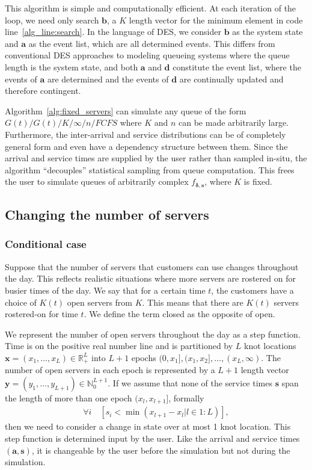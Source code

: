 \documentclass[article]{jss}
\begin{document}
This algorithm is simple and computationally efficient. At each iteration of the loop, we need only search $\mathbf{b}$, a $K$ length vector for the minimum element in code line~\ref{alg_line:search}. In the language of DES, we consider $\mathbf{b}$ as the system state and $\mathbf{a}$ as the event list, which are all determined events. This differs from conventional DES approaches to modeling queueing systems where the queue length is the system state, and both $\mathbf{a}$ and $\mathbf{d}$ constitute the event list, where the events of $\mathbf{a}$ are determined and the events of $\mathbf{d}$ are continually updated and therefore contingent.  

Algorithm~\ref{alg:fixed_servers} can simulate any queue of the form $G(t)/G(t)/K/\infty/n/\mathit{FCFS}$ where $K$ and $n$ can be made arbitrarily large. Furthermore, the inter-arrival and service distributions can be of completely general form and even have a dependency structure between them. Since the arrival and service times are supplied by the user rather than sampled in-situ, the algorithm ``decouples'' statistical sampling from queue computation. This frees the user to simulate queues of arbitrarily complex $f_{\boldsymbol{\delta}, \mathbf{s}}$, where $K$ is fixed. 

\subsection{Changing the number of servers}

\subsubsection{Conditional case}

Suppose that the number of servers that customers can use changes throughout the day. This reflects realistic situations where more servers are rostered on for busier times of the day. We say that for a certain time $t$, the customers have a choice of $K(t)$ open servers from $K$. This means that there are $K(t)$ servers rostered-on for time $t$. We define the term closed as the opposite of open. 

We represent the number of open servers throughout the day as a step
function. Time is on the positive real number line and is partitioned
by $L$ knot locations
$\mathbf{x} = (x_1, \ldots, x_L ) \in \mathbb{R}^L_{+}$ into $L+1$
epochs $(0, x_1], (x_1, x_2], \ldots, (x_L, \infty)$. The number of
open servers in each epoch is represented by a $L+1$ length vector
$\mathbf{y} = (y_1, \ldots, y_{L+1} ) \in \mathbb{N}^{L+1}_0$. If we
assume that none of the service times $\mathbf{s}$ span the length of
more than one epoch $(x_{l}, x_{l+1}]$, formally
%
\begin{align}
\forall i \quad \left[ s_i < \min({ x_{l+1} - x_{l} | l \in 1:L }) \right] \label{eq:condition},
\end{align}
%
then we need to consider a change in state over at most 1 knot
location. This step function is determined input by the user. Like the
arrival and service times $\mathbf{(a,s)}$, it is changeable by the
user before the simulation but not during the simulation.
\end{document}
